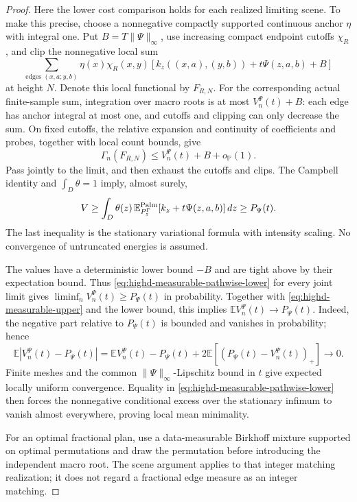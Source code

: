 \documentclass[11pt,reqno]{amsart}
\theoremstyle{definition}
\theoremstyle{remark}
\numberwithin{equation}{section}
\newcommand{\E}{\mathbb E}
\begin{document}
\begin{proof}
Here the lower cost comparison holds for each realized limiting
scene. To make this precise, choose a nonnegative compactly supported
continuous anchor \(\eta\) with integral one. Put
\(B=T\|\Psi\|_\infty\), use increasing compact endpoint cutoffs
\(\chi_R\), and clip the nonnegative local sum
\[
 \sum_{\text{edges }(x,a;y,b)}
  \eta(x)\chi_R(x,y)[k_z((x,a),(y,b))+t\Psi(z,a,b)+B]
\]
at height \(N\). Denote this local functional by \(F_{R,N}\).
For the corresponding actual finite-sample sum, integration over
macro roots is at most \(V_n^\Psi(t)+B\): each edge has anchor
integral at most one, and cutoffs and clipping can only decrease the
sum. On fixed cutoffs, the relative expansion and continuity of
coefficients and probes, together with local count bounds, give
\[
       \Gamma_n(F_{R,N})\le V_n^\Psi(t)+B+o_{\mathbb P}(1).
\]
Pass jointly to the limit, and then exhaust the cutoffs and clips.
The Campbell identity and \(\int_D\theta=1\) imply, almost surely,
\begin{equation}
\label{eq:highd-measurable-pathwise-lower}
 V\ge\int_D\theta(z)\,
       \E_{P_z^\Gamma}^{\rm Palm}[k_z+t\Psi(z,a,b)]\,dz
   \ge P_\Psi(t).
\end{equation}
The last inequality is the stationary variational formula with
intensity scaling. No convergence of untruncated energies is assumed.

The values have a deterministic lower bound \(-B\) and are tight
above by their expectation bound. Thus
\eqref{eq:highd-measurable-pathwise-lower} for every joint limit gives
\(\liminf_n V_n^\Psi(t)\ge P_\Psi(t)\) in probability.
Together with \eqref{eq:highd-measurable-upper} and the lower bound,
this implies \(\E V_n^\Psi(t)\to P_\Psi(t)\). Indeed, the negative
part relative to \(P_\Psi(t)\) is bounded and vanishes in probability;
hence
\[
 \E|V_n^\Psi(t)-P_\Psi(t)|
 =\E V_n^\Psi(t)-P_\Psi(t)
       +2\E[(P_\Psi(t)-V_n^\Psi(t))_+]\longrightarrow0.
\]
Finite meshes and the common \(\|\Psi\|_\infty\)-Lipschitz bound
in \(t\) give expected locally uniform convergence. Equality in
\eqref{eq:highd-measurable-pathwise-lower} then forces the
nonnegative conditional excess over the stationary infimum to vanish
almost everywhere, proving local mean minimality.

For an optimal fractional plan, use a data-measurable Birkhoff mixture
supported on optimal permutations and draw the permutation before
introducing the independent macro root. The scene argument applies
to that integer matching realization; it does not regard a fractional
edge measure as an integer matching.
\end{proof}
\end{document}
